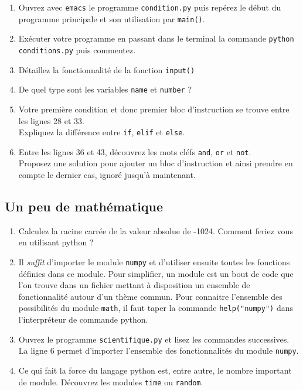 \begin{enumerate}

\item  Ouvrez avec  \texttt{emacs} le  programme \texttt{condition.py}
  puis repérez le début du programme principale et son utilisation par
  \texttt{main()}.
  
\item Exécuter votre programme en passant dans le terminal la commande
  \texttt{python conditions.py} puis commentez.

\item Détaillez la fonctionnalité de la fonction \texttt{input()}

\item De quel type sont les variables \texttt{name} et \texttt{number}
  ?

\item Votre première  condition et donc premier  bloc d'instruction se
  trouve entre  les lignes 28  et 33.\\ Expliquez la  différence entre
  \texttt{if}, \texttt{elif} et \texttt{else}.

\item  Entre   les  lignes  36   et  43,  découvrez  les   mots  cléfs
  \texttt{and}, \texttt{or}  et \texttt{not}.\\ Proposez  une solution
  pour ajouter  un bloc  d'instruction et ainsi  prendre en  compte le
  dernier cas, ignoré jusqu'à maintenant.


\end{enumerate}

\subsection{Un peu de mathématique}

\begin{enumerate}
\item Calculez la racine carrée de la valeur absolue de -1024.
  Comment feriez vous en utilisant python ?

\item Il \textit{suffit} d'importer le module \texttt{numpy} et d'utiliser ensuite
  toutes les fonctions définies dans ce module.
  Pour simplifier, un module est un bout de code que l'on trouve dans un fichier
  mettant à disposition un ensemble de fonctionnalité autour d'un thème commun.
  Pour connaitre l'ensemble des possibilités du module \texttt{math}, il faut taper la commande
  \texttt{help("numpy")} dans l'interpréteur de commande python.


\item Ouvrez le programme \texttt{scientifique.py} et lisez les commandes successives.
  La ligne 6 permet d'importer l'ensemble des fonctionnalités du module \texttt{numpy}.

\item Ce qui fait la force du langage python est, entre autre, le nombre important de module.
  Découvrez les modules \texttt{time} ou \texttt{random}.


\end{enumerate}




